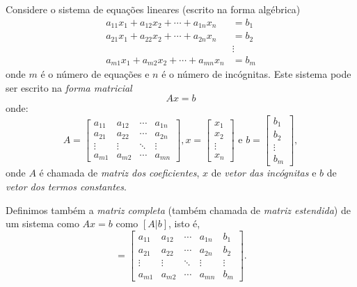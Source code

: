 Considere o sistema de equações lineares (escrito na forma algébrica)
\begin{equation}
  \begin{split}
    a_{11}x_1 + a_{12}x_2 + \cdots +a_{1n}x_n &= b_1\\
    a_{21}x_1 + a_{22}x_2 + \cdots +a_{2n}x_n &= b_2\\
    &\vdots \\
    a_{m1}x_1 + a_{m2}x_2 + \cdots +a_{mn}x_n &= b_m
  \end{split}
\end{equation}
onde $m$ é o número de equações e $n$ é o número de incógnitas.  Este sistema pode ser escrito na \emph{forma matricial}
\begin{equation}
  Ax = b
\end{equation}
onde:
\begin{equation}
  A=\begin{bmatrix}
a_{11} & a_{12} & \cdots & a_{1n}\\
a_{21} & a_{22} & \cdots & a_{2n}\\
\vdots & \vdots & \ddots & \vdots\\
a_{m1} & a_{m2} & \cdots & a_{mn}
\end{bmatrix},
x=\begin{bmatrix}
x_{1} \\
x_{2} \\
\vdots \\
x_{n}
\end{bmatrix}
 \text{ e } b=\begin{bmatrix}
b_{1} \\
b_{2} \\
\vdots \\
b_{m}
\end{bmatrix},
\end{equation}
onde $A$ é chamada de \emph{matriz dos coeficientes}, $x$ de \emph{vetor das incógnitas} e $b$ de \emph{vetor dos termos constantes}.


Definimos também a \emph{matriz completa} (também chamada de \emph{matriz estendida}) de um sistema como $Ax=b$ como $[A|b]$, isto é,
\begin{equation}
 [A|b]=\left[\begin{array}{cccc|c}
a_{11} & a_{12} & \cdots & a_{1n}&b_1\\
a_{21} & a_{22} & \cdots & a_{2n}&b_2\\
\vdots & \vdots & \ddots & \vdots&\vdots\\
a_{m1} & a_{m2} & \cdots & a_{mn}&b_m
\end{array}\right].
\end{equation}



